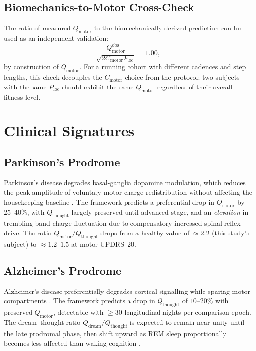 \documentclass[11pt,twocolumn,a4paper]{article}
\theoremstyle{definition}
\theoremstyle{remark}
\newcommand{\Qth}{Q_{\mathrm{thought}}}
\newcommand{\Qmo}{Q_{\mathrm{motor}}}
\newcommand{\Qdr}{Q_{\mathrm{dream}}}
\newcommand{\Ploc}{P_{\mathrm{loc}}}
\newcommand{\Cmotor}{C_{\mathrm{motor}}}
\begin{document}
\subsection{Biomechanics-to-Motor Cross-Check}

The ratio of measured $\Qmo$ to the biomechanically derived
prediction can be used as an independent validation:
\begin{equation}
\frac{\Qmo^{\mathrm{obs}}}{\sqrt{2\Cmotor\Ploc}} = 1.00,
\end{equation}
by construction of $\Qmo$. For a running cohort with different
cadences and step lengths, this check decouples the $\Cmotor$
choice from the protocol: two subjects with the same $\Ploc$ should
exhibit the same $\Qmo$ regardless of their overall fitness level.

\section{Clinical Signatures}
\label{sec:clinical}

\subsection{Parkinson's Prodrome}

Parkinson's disease degrades basal-ganglia dopamine modulation,
which reduces the peak amplitude of voluntary motor charge
redistribution without affecting the housekeeping baseline
\citep{jankovic2008}. The framework predicts a preferential drop
in $\Qmo$ by $25$--$40\%$, with $\Qth$ largely preserved until
advanced stage, and an \emph{elevation} in trembling-band
charge fluctuation due to compensatory increased spinal reflex
drive. The ratio $\Qmo/\Qth$ drops from a healthy value of
$\approx 2.2$ (this study's subject) to $\approx 1.2$--$1.5$ at
motor-UPDRS~20.

\subsection{Alzheimer's Prodrome}

Alzheimer's disease preferentially degrades cortical signalling
while sparing motor compartments \citep{selkoe2002,bateman2012}. The
framework predicts a drop in $\Qth$ of $10$--$20\%$ with preserved
$\Qmo$, detectable with $\ge 30$ longitudinal nights per comparison
epoch. The dream--thought ratio $\Qdr/\Qth$ is expected to remain
near unity until the late prodromal phase, then shift upward as
REM sleep proportionally becomes less affected than waking cognition
\citep{mander2015}.
\end{document}
